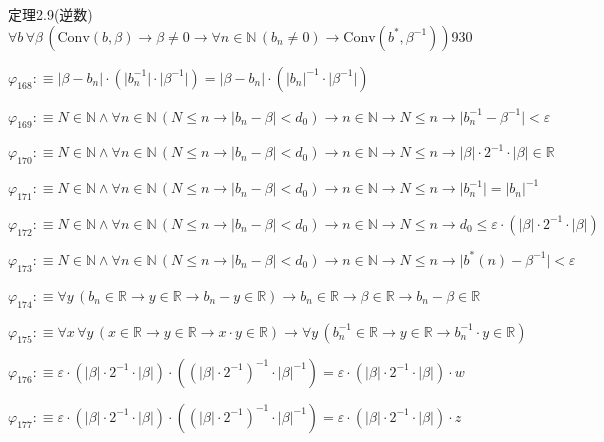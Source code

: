 \begin{fullproof}{定理2.9(逆数)}{$\forall b\,\forall \beta\,(\mathrm{Conv}(b,\beta) \to \beta \neq 0 \to \forall n \in \mathbb{N}\,(b_{n} \neq 0) \to \mathrm{Conv}(b^{\ast},\beta^{-1}))$}{930}
\begin{abbrevlist}
\item $\varphi_{168} :\equiv \lvert \beta - b_{n} \rvert \cdot (\lvert b_{n}^{-1} \rvert \cdot \lvert \beta^{-1} \rvert) = \lvert \beta - b_{n} \rvert \cdot (\lvert b_{n} \rvert^{-1} \cdot \lvert \beta^{-1} \rvert)$
\item $\varphi_{169} :\equiv N \in \mathbb{N} \land \forall n \in \mathbb{N}\,(N \leq n \to \lvert b_{n} - \beta \rvert < d_{0}) \to n \in \mathbb{N} \to N \leq n \to \lvert b_{n}^{-1} - \beta^{-1} \rvert < \varepsilon$
\item $\varphi_{170} :\equiv N \in \mathbb{N} \land \forall n \in \mathbb{N}\,(N \leq n \to \lvert b_{n} - \beta \rvert < d_{0}) \to n \in \mathbb{N} \to N \leq n \to \lvert \beta \rvert \cdot 2^{-1} \cdot \lvert \beta \rvert \in \mathbb{R}$
\item $\varphi_{171} :\equiv N \in \mathbb{N} \land \forall n \in \mathbb{N}\,(N \leq n \to \lvert b_{n} - \beta \rvert < d_{0}) \to n \in \mathbb{N} \to N \leq n \to \lvert b_{n}^{-1} \rvert = \lvert b_{n} \rvert^{-1}$
\item $\varphi_{172} :\equiv N \in \mathbb{N} \land \forall n \in \mathbb{N}\,(N \leq n \to \lvert b_{n} - \beta \rvert < d_{0}) \to n \in \mathbb{N} \to N \leq n \to d_{0} \leq \varepsilon \cdot (\lvert \beta \rvert \cdot 2^{-1} \cdot \lvert \beta \rvert)$
\item $\varphi_{173} :\equiv N \in \mathbb{N} \land \forall n \in \mathbb{N}\,(N \leq n \to \lvert b_{n} - \beta \rvert < d_{0}) \to n \in \mathbb{N} \to N \leq n \to \lvert b^{\ast}(n) - \beta^{-1} \rvert < \varepsilon$
\item $\varphi_{174} :\equiv \forall y\,(b_{n} \in \mathbb{R} \to y \in \mathbb{R} \to b_{n} - y \in \mathbb{R}) \to b_{n} \in \mathbb{R} \to \beta \in \mathbb{R} \to b_{n} - \beta \in \mathbb{R}$
\item $\varphi_{175} :\equiv \forall x\,\forall y\,(x \in \mathbb{R} \to y \in \mathbb{R} \to x \cdot y \in \mathbb{R}) \to \forall y\,(b_{n}^{-1} \in \mathbb{R} \to y \in \mathbb{R} \to b_{n}^{-1} \cdot y \in \mathbb{R})$
\item $\varphi_{176} :\equiv \varepsilon \cdot (\lvert \beta \rvert \cdot 2^{-1} \cdot \lvert \beta \rvert) \cdot ((\lvert \beta \rvert \cdot 2^{-1})^{-1} \cdot \lvert \beta \rvert^{-1}) = \varepsilon \cdot (\lvert \beta \rvert \cdot 2^{-1} \cdot \lvert \beta \rvert) \cdot w$
\item $\varphi_{177} :\equiv \varepsilon \cdot (\lvert \beta \rvert \cdot 2^{-1} \cdot \lvert \beta \rvert) \cdot ((\lvert \beta \rvert \cdot 2^{-1})^{-1} \cdot \lvert \beta \rvert^{-1}) = \varepsilon \cdot (\lvert \beta \rvert \cdot 2^{-1} \cdot \lvert \beta \rvert) \cdot z$

\end{abbrevlist}
\end{fullproof}
